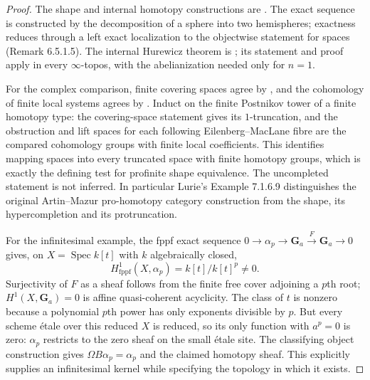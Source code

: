 \begin{proof}
The shape and internal homotopy constructions are
\cite[Definitions 7.1.6.1 and 7.1.6.3; Definition 6.5.1.1 and
Remarks 6.5.1.3--6.5.1.6]{BLurieHTT}. The exact sequence is constructed
by the decomposition of a sphere into two hemispheres; exactness
reduces through a left exact localization to the objectwise statement
for spaces (Remark 6.5.1.5). The internal Hurewicz theorem is
\cite[Theorem H and Theorem 3.12]{BChristensenScoccola}; its statement
and proof apply in every $\infty$-topos, with the abelianization
needed only for $n=1$.

For the complex comparison, finite covering spaces agree by
\cite[Expos\'e XII, Theorem 5.1, original pp.~332--333]{BSGA1},
and the cohomology of finite local systems agrees by
\cite[Expos\'e XVI, Theorem 4.1]{BSGA4XVI}. Induct on the finite
Postnikov tower of a finite homotopy type: the covering-space
statement gives its $1$-truncation, and the obstruction and lift
spaces for each following Eilenberg--MacLane fibre are the compared
cohomology groups with finite local coefficients. This identifies
mapping spaces into every truncated space with finite homotopy
groups, which is exactly the defining test for profinite shape
equivalence. The uncompleted statement is not inferred. In
particular Lurie's Example 7.1.6.9 distinguishes the original
Artin--Mazur pro-homotopy category construction from the shape,
its hypercompletion and its protruncation.

For the infinitesimal example, the fppf exact sequence
$0\to\alpha_p\to\mathbf G_a\xrightarrow{F}\mathbf G_a\to0$
gives, on $X=\operatorname{Spec}k[t]$ with $k$ algebraically closed,
\[
 H^1_{\mathrm{fppf}}(X,\alpha_p)=k[t]/k[t]^p\ne0.
\]
Surjectivity of $F$ as a sheaf follows from the finite free cover
adjoining a $p$th root; $H^1(X,\mathbf G_a)=0$ is affine
quasi-coherent acyclicity. The class of $t$ is nonzero because a
polynomial $p$th power has only exponents divisible by $p$.
But every scheme \'etale over this reduced $X$ is reduced, so its
only function with $a^p=0$ is zero: $\alpha_p$ restricts to the zero
sheaf on the small \'etale site. The classifying object construction
gives $\Omega B\alpha_p=\alpha_p$ and the claimed homotopy sheaf.
This explicitly supplies an infinitesimal kernel while specifying
the topology in which it exists.
\end{proof}

